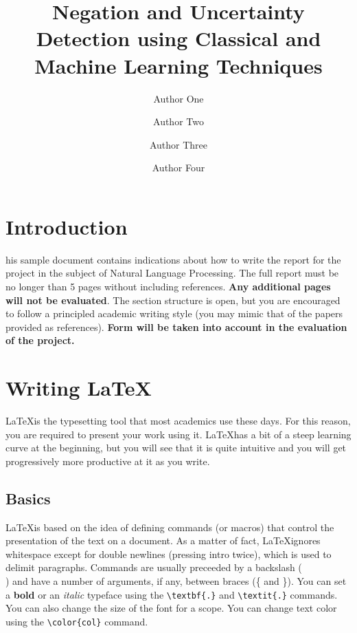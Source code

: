 \documentclass[9pt,a4paper,twoside]{tau-class/tau}
\title{Negation and Uncertainty Detection using Classical and Machine Learning Techniques}
\author[a,1]{Author One}
\author[b,2]{Author Two}
\author[c,3]{Author Three}
\author[d,4]{Author Four}
\affil[a]{NIU of Author one}
\affil[b]{NIU of author two}
\affil[c]{NIU of author three}
\affil[d]{NIU of author four}
\begin{document}
    \maketitle 
    \thispagestyle{firststyle} \tauabstract 
    \tableofcontents
    \linenumbers 
    

\section{Introduction}

    his sample document contains indications about how to write the report for the project in the subject of Natural Language Processing. The full report must be no longer than 5 pages without including references. \textbf{Any additional pages will not be evaluated}. The section structure is open, but you are encouraged to follow a principled academic writing style (you may mimic that of the papers provided as references). \textbf{Form will be taken into account in the evaluation of the project.}

\section{Writing \LaTeX}

	\LaTeX is the typesetting tool that most academics use these days. For this reason, you are required to present your work using it. \LaTeX has a bit of a steep learning curve at the beginning, but you will see that it is quite intuitive and you will get progressively more productive at it as you write.

    \subsection{Basics}

    \LaTeX is based on the idea of defining commands (or macros) that control the presentation of the text on a document. As a matter of fact, \LaTeX ignores whitespace except for double newlines (pressing intro twice), which is used to delimit paragraphs. Commands are usually preceeded by a backslash (\\) and have a number of arguments, if any, between braces (\{ and \}). You can set a \textbf{bold} or an \textit{italic} typeface using the \verb|\textbf{.}| and \verb|\textit{.}| commands. You can also {\tiny change the size of the font for a scope}. You can change {\color{red} text color} using the \verb|\color{col}| command. 
\end{document}
